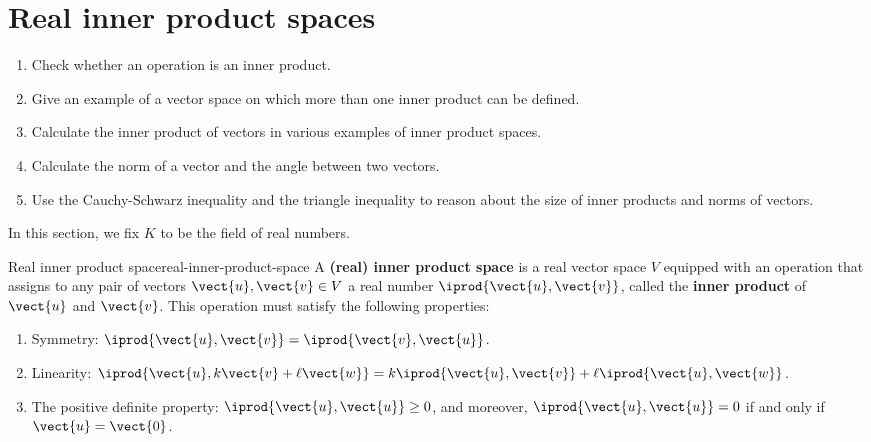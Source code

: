 \section{Real inner product spaces}

\begin{outcome}
  \begin{enumerate}
  \item Check whether an operation is an inner product.
  \item Give an example of a vector space on which more than one inner
    product can be defined.
  \item Calculate the inner product of vectors in various examples
    of inner product spaces.
  \item Calculate the norm of a vector and the angle between two vectors.
  \item Use the Cauchy-Schwarz inequality and the triangle inequality
    to reason about the size of inner products and norms of vectors.
  \end{enumerate}
\end{outcome}

In this section, we fix $K$ to be the field of real numbers.

\begin{definition}{Real inner product space}{real-inner-product-space}
  A \textbf{(real) inner product space}%
   is a real vector space $V$ equipped
  with an operation that assigns to any pair of vectors
  $\vect{u},\vect{v}\in V$ a real number $\iprod{\vect{u},\vect{v}}$,
  called the \textbf{inner product}%
   of $\vect{u}$ and
  $\vect{v}$. This operation must satisfy the following properties:
  \begin{enumerate}
  \item Symmetry:%
    $\iprod{\vect{u},\vect{v}} = \iprod{\vect{v},\vect{u}}$.
  \item Linearity:%
    $\iprod{\vect{u},k\vect{v}+\ell\vect{w}}
    = k\iprod{\vect{u},\vect{v}}+\ell\iprod{\vect{u},\vect{w}}$.
  \item The positive definite property:%
    $\iprod{\vect{u},\vect{u}} \geq 0$, and moreover,
    $\iprod{\vect{u},\vect{u}}=0$ if and only if
    $\vect{u} = \vect{0}$.
  \end{enumerate}
\end{definition}

